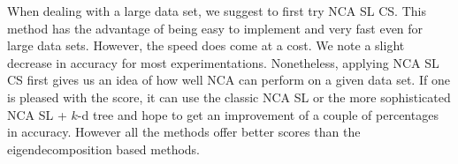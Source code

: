 When dealing with a large data set, we suggest to first try NCA SL CS. This method has the advantage of being easy to implement and very fast even for large data sets. However, the speed does come at a cost. We note a slight decrease in accuracy for most experimentations. Nonetheless, applying NCA SL CS first gives us an idea of how well NCA can perform on a given data set. If one is pleased with the score, it can use the classic NCA SL or the more sophisticated NCA SL + $k$-d tree and hope to get an improvement of a couple of percentages in accuracy. However all the methods offer better scores than the eigendecomposition based methods.

